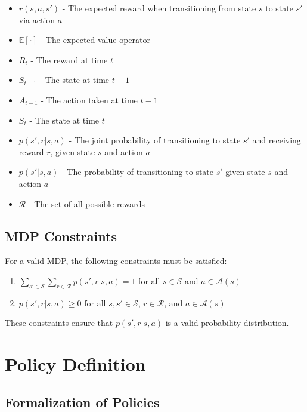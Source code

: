\documentclass[12pt,a4paper]{article}
\begin{document}
\begin{tcolorbox}[title=Notation Overview]
\begin{itemize}
    \item $r(s,a,s')$ - The expected reward when transitioning from state $s$ to state $s'$ via action $a$
    \item $\mathbb{E}[\cdot]$ - The expected value operator
    \item $R_t$ - The reward at time $t$
    \item $S_{t-1}$ - The state at time $t-1$
    \item $A_{t-1}$ - The action taken at time $t-1$
    \item $S_t$ - The state at time $t$
    \item $p(s',r|s,a)$ - The joint probability of transitioning to state $s'$ and receiving reward $r$, given state $s$ and action $a$
    \item $p(s'|s,a)$ - The probability of transitioning to state $s'$ given state $s$ and action $a$
    \item $\mathcal{R}$ - The set of all possible rewards
\end{itemize}
\end{tcolorbox}

\subsection{MDP Constraints}

For a valid MDP, the following constraints must be satisfied:

\begin{enumerate}
    \item $\sum_{s' \in \mathcal{S}} \sum_{r \in \mathcal{R}} p(s',r|s,a) = 1$ for all $s \in \mathcal{S}$ and $a \in \mathcal{A}(s)$
    \item $p(s',r|s,a) \geq 0$ for all $s, s' \in \mathcal{S}$, $r \in \mathcal{R}$, and $a \in \mathcal{A}(s)$
\end{enumerate}

These constraints ensure that $p(s',r|s,a)$ is a valid probability distribution.

\section{Policy Definition}

\subsection{Formalization of Policies}
\end{document}
